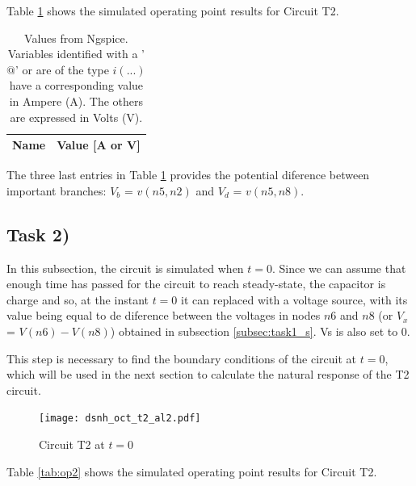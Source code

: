 Table \ref{tab:op1} shows the simulated operating point results for Circuit T2.

\begin{table}[H]
	\centering
	\begin{tabular}{|l|r|}
		\hline    
		{\bf Name} & {\bf Value [A or V]} \\ \hline
    		
	\end{tabular}
	
	\caption{Values from Ngspice. Variables identified with a '$@$' or are of the type
	$i(...)$ have a corresponding value in Ampere (A). The others are expressed in Volts (V).}
    
\label{tab:op1}
\end{table}

The three last entries in Table \ref{tab:op1} provides the potential diference between important
branches: $V_b$ = $v(n5,n2)$ and $V_d$ = $v(n5,n8)$.


\subsection{Task 2)}
\label{subsec:task2_s}


In this subsection, the circuit is simulated when $t=0$. Since we can assume that enough time has passed for the circuit to reach steady-state, the capacitor is charge and so, at the instant $t=0$ it can replaced with a voltage source, 
with its value being equal to de diference between the voltages in nodes $n6$ and $n8$ (or $V_x$ = $V(n6)-
V(n8)$) obtained in subsection \ref{subsec:task1_s}. Vs is also set to 0.

This step is necessary to find the boundary conditions of the circuit at $t=0$, which will be used in the next section to calculate the natural response of the T2 circuit.

\begin{figure}[H]
	\centering
	\texttt{[image: dsnh\_oct\_t2\_al2.pdf]}
	\caption{Circuit T2 at $t=0$}
\label{fig:Dsnh_sim_t2}
\end{figure}

Table \ref{tab:op2} shows the simulated operating point results for Circuit T2.

